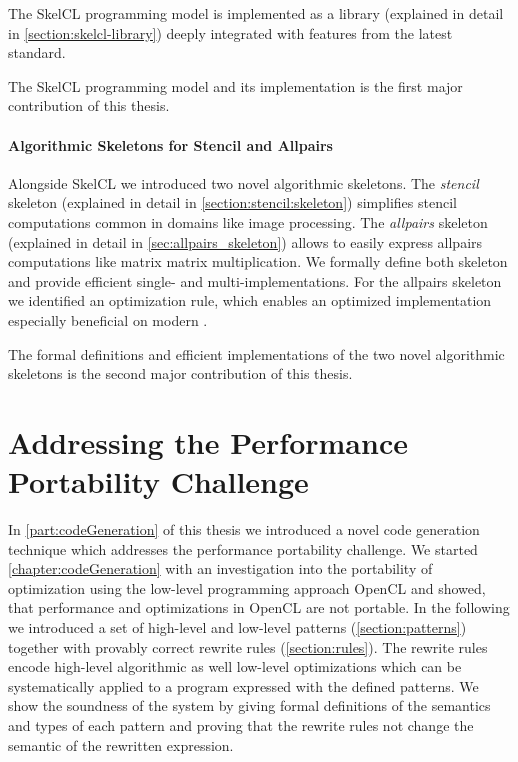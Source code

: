 \noindent
The SkelCL programming model is implemented as a \Cpp library (explained in detail in \autoref{section:skelcl-library}) deeply integrated with features from the latest \Cpp standard.


\bigskip
The SkelCL programming model and its implementation is the first major contribution of this thesis.

\paragraph{Algorithmic Skeletons for Stencil and Allpairs}
Alongside SkelCL we introduced two novel algorithmic skeletons.
The \emph{stencil} skeleton (explained in detail in \autoref{section:stencil:skeleton}) simplifies stencil computations common in domains like image processing.
The \emph{allpairs} skeleton (explained in detail in \autoref{sec:allpairs_skeleton}) allows to easily express allpairs computations like matrix matrix multiplication.
We formally define both skeleton and provide efficient single- and multi-\GPU implementations.
For the allpairs skeleton we identified an optimization rule, which enables an optimized implementation especially beneficial on modern \GPUs.


\bigskip
The formal definitions and efficient implementations of the two novel algorithmic skeletons is the second major contribution of this thesis.


\section{Addressing the Performance Portability Challenge}
In \autoref{part:codeGeneration} of this thesis we introduced a novel code generation technique which addresses the performance portability challenge.
We started \autoref{chapter:codeGeneration} with an investigation into the portability of optimization using the low-level programming approach OpenCL and showed, that performance and optimizations in OpenCL are not portable.
In the following we introduced a set of high-level and low-level patterns (\autoref{section:patterns}) together with provably correct rewrite rules (\autoref{section:rules}).
The rewrite rules encode high-level algorithmic as well low-level optimizations which can be systematically applied to a program expressed with the defined patterns.
We show the soundness of the system by giving formal definitions of the semantics and types of each pattern and proving that the rewrite rules not change the semantic of the rewritten expression.


